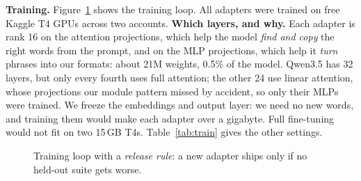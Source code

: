 \documentclass[10pt,a4paper]{article}
\begin{document}
\textbf{Training.} Figure~\ref{fig:train} shows the training loop. All
adapters were trained on free Kaggle T4 GPUs across two accounts.
\textbf{Which layers, and why.} Each adapter is rank 16 on the attention projections,
which help the model \emph{find and copy} the right words from the prompt, and on the MLP
projections, which help it \emph{turn} phrases into our formats: about 21M weights, 0.5\% of
the model. Qwen3.5 has 32 layers, but only every fourth uses full attention; the other 24 use
linear attention, whose projections our module pattern missed by accident, so only their
MLPs were trained. We freeze the embeddings and output layer: we need no new words, and
training them would make each adapter over a gigabyte. Full fine-tuning would not fit on
two 15\,GB T4s. Table~\ref{tab:train} gives the other settings.

\begin{figure}[H]
\centering
{}
\caption{Training loop with a \emph{release rule}: a new adapter ships only if no held-out suite gets worse.}
\label{fig:train}
\end{figure}
\end{document}
